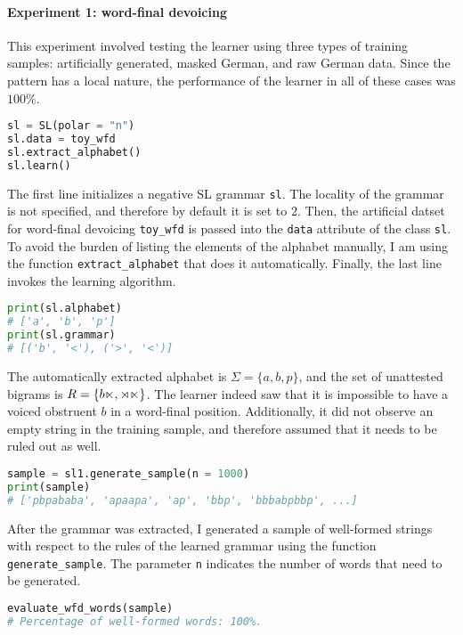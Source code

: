 \paragraph{Experiment 1: word-final devoicing}

This experiment involved testing the learner using three types of training samples: artificially generated, masked German, and raw German data.
Since the pattern has a local nature, the performance of the learner in all of these cases was $100$\%.

\begin{lstlisting}[language=Python]
sl = SL(polar = "n")
sl.data = toy_wfd
sl.extract_alphabet()
sl.learn()
\end{lstlisting}

The first line initializes a negative SL grammar \texttt{sl}.
The locality of the grammar is not specified, and therefore by default it is set to $2$.
Then, the artificial datset for word-final devoicing \texttt{toy\_wfd} is passed into the \texttt{data} attribute of the class \texttt{sl}.
To avoid the burden of listing the elements of the alphabet manually, I am using the function \texttt{extract\_alphabet} that does it automatically.
Finally, the last line invokes the learning algorithm.

\begin{lstlisting}[language=Python]
print(sl.alphabet)
# ['a', 'b', 'p']
print(sl.grammar)
# [('b', '<'), ('>', '<')]
\end{lstlisting}

The automatically extracted alphabet is $\Sigma = \{a, b, p\}$, and the set of unattested bigrams is $R = \{b\ltimes, \rtimes\ltimes\}$.
The learner indeed saw that it is impossible to have a voiced obstruent $b$ in a word-final position.
Additionally, it did not observe an empty string in the training sample, and therefore assumed that it needs to be ruled out as well.

\begin{lstlisting}[language=Python]
sample = sl1.generate_sample(n = 1000)
print(sample)
# ['pbpababa', 'apaapa', 'ap', 'bbp', 'bbbabpbbp', ...]
\end{lstlisting}

After the grammar was extracted, I generated a sample of well-formed strings with respect to the rules of the learned grammar using the function \texttt{generate\_sample}.
The parameter \texttt{n} indicates the number of words that need to be generated.

\begin{lstlisting}[language=Python]
evaluate_wfd_words(sample)
# Percentage of well-formed words: 100%.
\end{lstlisting}

